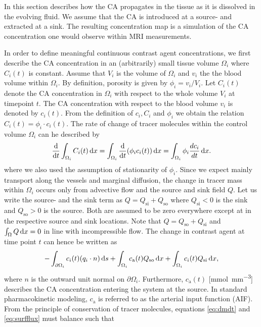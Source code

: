 \documentclass[paper=a4, fontsize=11pt,parskip=half,headings=small]{scrartcl}
\newcommand{\Qso}{Q_{\mathrm{so}}}
\newcommand{\Qsi}{Q_{\mathrm{si}}}
\newcommand{\ca}{c_\mathrm{a}}
\newcommand{\sic}{\milli\mol\per\milli\meter\cubed}
\begin{document}
	In this section describes how the CA propagates in the tissue as it is dissolved in the evolving fluid.
	We assume that the CA is introduced at a source- and extracted at a sink.
	The resulting concentration map is a simulation of the CA concentration one would observe within MRI measurements.
	
	In order to define meaningful continuous contrast agent concentrations, we first describe the CA concentration in an (arbitrarily) small tissue volume $\Omega_i$ where $C_i(t)$ is constant.
	Assume that $V_i$ is the volume of $\Omega_i$ and $v_i$ the the blood volume within $\Omega_i$.
	By definition, porosity is given by $\phi_i = v_i/V_i$.
	Let $C_i(t)$ denote the CA concentration in $\Omega_i$ with respect to the whole volume $V_i$ at timepoint $t$.
	The CA concentration with respect to the blood volume $v_i$ is denoted by $c_i(t)$.
	From the definition of $c_i,C_i$ and $\phi_i$ we obtain the relation $C_i(t) = \phi_i \cdot c_i(t)$.
	The rate of change of tracer molecules within the control volume $\Omega_i$ can he described by
	\begin{equation}
		\frac{\mathrm{d}}{\mathrm{d} t}\int_{\Omega_i}C_i(t) \,\mathrm{d} x = \int_{\Omega_i}\frac{\mathrm{d}}{\mathrm{d} t}(\phi_i c_i(t)) \,\mathrm{d} x = \int_{\Omega_i} \phi_i \frac{d c_i}{dt}\,\mathrm{d} x.
		\label{eq:dmdt}
	\end{equation}	
	where we also used the assumption of stationarity of $\phi_i$.
	Since we expect mainly transport along the vessels and marginal diffusion, the change in tracer mass within $\Omega_i$ occurs only from advective flow and the source and sink field $Q$.
	Let us write the source- and the sink term as $Q = \Qsi + \Qso$ where $\Qsi < 0$ is the sink and $\Qso > 0$ is the source. 
	Both are assumed to be zero everywhere except at in the respective source and sink locations.
	Note that $Q = \Qso + \Qsi$ and $\int_\Omega Q \,\mathrm{d} x = 0$ in line with incompressible flow. 
	The change in contrast agent at time point $t$ can hence be written as
	\begin{equation}
		-\int_{ \partial \Omega_i}c_i(t)(q_i \cdot n)\diffint s + \int_{\Omega_i}\ca(t) \Qso \diffint x + \int_{\Omega_i}c_i(t)\Qsi \diffint x,
		\label{eq:surfflux}
	\end{equation}
	where $n$ is the outward unit normal on $\partial \Omega_i$.
	Furthermore, $\ca(t)$ [\si{\sic}] describes the CA concentration entering the system at the source. 
	In standard pharmacokinetic modeling, $\ca$ is referred to as the arterial input function (AIF).
	From the principle of conservation of tracer molecules, equations \eqref{eq:dmdt} and \eqref{eq:surfflux} must balance such that
\end{document}
